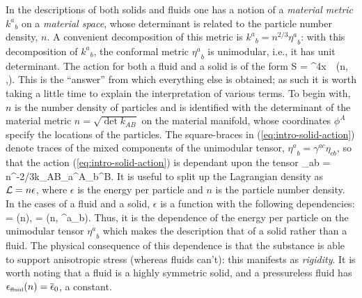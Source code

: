In the descriptions of both solids and fluids  one has a notion of a \textit{material metric} ${k^a}_b$ on a \textit{material space}, whose determinant is related to the particle number density, $n$. A convenient decomposition of this metric is ${k^a}_b = n^{2/3}{\eta^a}_b$: with this decomposition of   ${k^a}_b$, the conformal metric ${\eta^a}_b$ is unimodular, i.e., it has unit determinant. The action for both a fluid and a solid is of the form 
\bea
\label{eq:intro-solid-action}
S = \int \dd^4x\, \, \ld\left(n, \left[ \gbm{\eta}\right],\left[\gbm{\eta}^2\right]\right).
\eea
This is the ``answer'' from which everything else is obtained; as such it is worth taking a little time to explain the interpretation of various terms. To begin with, $n$ is the number density of particles and is identified with the determinant of the material metric $n = \sqrt{\det k_{AB}}$ on the material manifold, whose coordinates $\phi^A$ specify the locations of the particles. The square-braces in (\ref{eq:intro-solid-action}) denote traces of the mixed components of the unimodular tensor, ${\eta^a}_b = \gamma^{ac}\eta_{cb}$, so that the action (\ref{eq:intro-solid-action}) is dependant upon the tensor
\bea
\eta_{ab} = n^{-2/3}k_{AB}\partial_a\phi^A\partial_b\phi^B.
\eea
It is useful to split up the Lagrangian density   as $\mathcal{L} = n \epsilon$, where $\epsilon$ is the energy per particle and $n$ is the particle number density. In the  cases of a fluid and a solid, $\epsilon$ is a function with the following dependencies:
\bea
{} = (n),\qquad {} = (n, {\eta^a}_b).
\eea
Thus, it is the dependence of the energy per particle on the unimodular tensor ${\eta^a}_b$ which makes the description that of a solid rather than a fluid. The physical consequence of this dependence is that the substance is able to support anisotropic stress (whereas fluids can't): this manifests as \textit{rigidity}. It is worth noting that a fluid is a highly symmetric solid, and a pressureless fluid has ${\epsilon}_{\scriptscriptstyle{\textrm{fluid}}}(n) = \overline{\epsilon}_0$, a constant.


